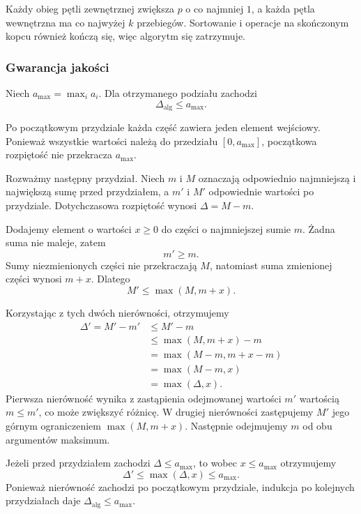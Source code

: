 \documentclass[11pt]{article}
\begin{document}
Każdy obieg pętli zewnętrznej zwiększa $p$ o co najmniej $1$,
a każda pętla wewnętrzna ma co najwyżej $k$ przebiegów. Sortowanie
i operacje na skończonym kopcu również kończą się, więc algorytm się
zatrzymuje.

\subsubsection{Gwarancja jakości}
Niech $a_{\max}=\max_i a_i$. Dla otrzymanego podziału zachodzi
\begin{equation}
  \boxed{\Delta_{\mathrm{alg}}\leq a_{\max}.}
\end{equation}

Po początkowym przydziale każda część zawiera jeden element wejściowy.
Ponieważ wszystkie wartości należą do przedziału $[0,a_{\max}]$,
początkowa rozpiętość nie przekracza $a_{\max}$.

Rozważmy następny przydział. Niech $m$ i $M$ oznaczają odpowiednio
najmniejszą i największą sumę przed przydziałem, a $m'$ i $M'$
odpowiednie wartości po przydziale. Dotychczasowa rozpiętość wynosi
$\Delta=M-m$.

Dodajemy element o wartości $x\geq0$ do części o najmniejszej sumie $m$.
Żadna suma nie maleje, zatem
\begin{equation}
  m'\geq m.
\end{equation}
Sumy niezmienionych części nie przekraczają $M$, natomiast suma
zmienionej części wynosi $m+x$. Dlatego
\begin{equation}
  M'\leq\max(M,m+x).
\end{equation}

Korzystając z tych dwóch nierówności, otrzymujemy
\begin{equation}
  \begin{aligned}
    \Delta'=M'-m'
    &\leq M'-m\\
    &\leq \max(M,m+x)-m\\
    &=\max(M-m,m+x-m)\\
    &=\max(M-m,x)\\
    &=\max(\Delta,x).
  \end{aligned}
\end{equation}
Pierwsza nierówność wynika z zastąpienia odejmowanej wartości $m'$
wartością $m\leq m'$, co może zwiększyć różnicę.
W drugiej nierówności zastępujemy $M'$ jego górnym ograniczeniem
$\max(M,m+x)$.
Następnie odejmujemy $m$ od obu argumentów maksimum.

Jeżeli przed przydziałem zachodzi $\Delta\leq a_{\max}$,
to wobec $x\leq a_{\max}$ otrzymujemy
\begin{equation}
  \Delta'\leq\max(\Delta,x)\leq a_{\max}.
\end{equation}
Ponieważ nierówność zachodzi po początkowym przydziale,
indukcja po kolejnych przydziałach daje
$\Delta_{\mathrm{alg}}\leq a_{\max}$.
\end{document}

